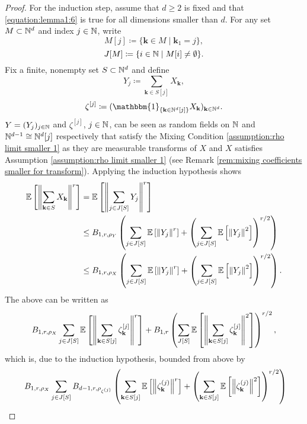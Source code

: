\begin{proof}
    For the induction step, assume that $d \geq 2$ is fixed and that \eqref{equation:lemma1:6} is true for all dimensions smaller than $d$. For any set $M \subset \mathbb{N}^d$ and index $j \in \mathbb{N}$, write \[ M[j] \coloneqq \{ \mathbf{k} \in M \mid \mathbf{k}_1 = j \}, \]
    \[ J[M] \coloneqq \{ i \in \mathbb{N} \mid M[i] \neq \emptyset \}. \]
    Fix a finite, nonempty set $S \subset \mathbb{N}^d$ and define
    \[ Y_j \coloneqq \sum\limits_{\mathbf{k} \in S[j]} X_\mathbf{k}, \]
    \[ \zeta^{[j]} \coloneqq (\mathbbm{1}_{\{\mathbf{k} \in \NN^d[j]\}} X_\mathbf{k})_{\mathbf{k} \in \NN^d}.  \]
    $Y = (Y_j)_{j \in \mathbb{N}}$ and $\zeta^{[j]}$, $j \in \mathbb{N}$, can be seen as random fields on $\mathbb{N}$ and $\mathbb{N}^{d-1} \cong \mathbb{N}^d[j]$ respectively that satisfy the Mixing Condition \ref{assumption:rho limit smaller 1} as they are measurable transforms of $X$ and $X$ satisfies Assumption \ref{assumption:rho limit smaller 1} (see Remark \ref{rem:mixing coefficients smaller for transform}).
    Applying the induction hypothesis shows
    \begin{align*}
        \mathbb{E}\left[\left\| \sum\limits_{\mathbf{k} \in S} X_\mathbf{k} \right\|^r\right]
        & = \mathbb{E}\left[\left\| \sum\limits_{j \in J[S]} Y_j \right\|^r\right] \\
        & \leq B_{1, r, \rho_{Y}} \left( \sum\limits_{j \in J[S]} \mathbb{E}\left[\left\| Y_j \right\|^r\right] + \left( \sum\limits_{j \in J[S]} \mathbb{E}\left[\left\| Y_j \right\|^2\right] \right)^{r/2} \right) \\
        & \leq B_{1, r, \rho_{X}} \left( \sum\limits_{j \in J[S]} \mathbb{E}\left[\left\| Y_j \right\|^r\right] + \left( \sum\limits_{j \in J[S]} \mathbb{E}\left[\left\| Y_j \right\|^2\right] \right)^{r/2} \right).
    \end{align*}
    The above can be written as
    \begin{align*}
        B_{1, r, \rho_X} \sum\limits_{j \in J[S]} \mathbb{E}\left[\left\| \sum\limits_{\mathbf{k} \in S[j]} \zeta_\mathbf{k}^{[j]} \right\|^r\right] + B_{1, r} \left( \sum\limits_{J[S]} \mathbb{E}\left[\left\| \sum\limits_{\mathbf{k} \in S[j]} \zeta_\mathbf{k}^{[j]} \right\|^2\right] \right)^{r/2},
    \end{align*}
    which is, due to the induction hypothesis, bounded from above by
    \begin{equation} \label{lemma1:inequality step 2} \begin{split}
        & \ B_{1, r, \rho_X} \sum\limits_{j \in J[S]} B_{d-1, r, \rho_{\zeta^{(j)}}} \left( \sum\limits_{\mathbf{k} \in S[j]} \EE{\left\| \zeta_\mathbf{k}^{(j)} \right\|^r} + \left( \sum\limits_{\mathbf{k} \in S[j]} \EE{\left\| \zeta_\mathbf{k}^{(j)} \right\|^2} \right)^{r/2} \right)  \\

\end{split}
\end{equation}
\end{proof}
